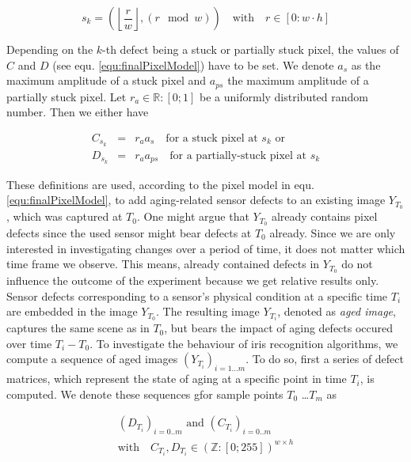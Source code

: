 \documentclass[10pt,twocolumn,letterpaper]{article}
\providecommand{\myfloor}[1]{\left \lfloor #1 \right \rfloor }
\begin{document}
\begin{equation}
 s_k = (\myfloor{\frac{r}{w}}, (r \mod{w})) \quad \text{with} \quad r \in [0:w \cdot h]
 \label{equ:defectLocation}
\end{equation}

Depending on the $k$-th defect being a stuck or partially stuck pixel, the values of $C$ and $D$ (see equ. \ref{equ:finalPixelModel}) have to be set. We denote $a_s$ as the maximum amplitude of a stuck pixel and $a_{ps}$ the maximum amplitude of a partially stuck pixel. Let $r_a \in \mathbb{R}:[0;1]$ be a uniformly distributed random number. Then we either have

\begin{eqnarray}
   C_{s_k}  & = & r_a  a_s \quad \text{for a stuck pixel at } s_k \text{ or} \label{equ:stucks} \\
   D_{s_k} & = &  r_a a_{ps} \quad \text{for a partially-stuck pixel at } s_k \label{equ:partiallyStuck}
\end{eqnarray}

These definitions are used, according to the pixel model in equ. \ref{equ:finalPixelModel}, to add aging-related sensor defects to an existing image $Y_{T_0}$, which was captured at ${T_0}$. One might argue that $Y_{T_0}$ already contains pixel defects since the used sensor might bear defects at $T_0$ already. Since we are only interested in investigating changes over a period of time, it does not matter which time frame we observe. This means, already contained defects in $Y_{T_0}$ do not influence the outcome of the experiment because we get relative results only. Sensor defects corresponding to a sensor's physical condition at a specific time $T_i$ are embedded in the image $Y_{T_0}$. The resulting image $Y_{T_i}$, denoted as \emph{aged image}, captures the same scene as in $T_0$, but bears the impact of aging defects occured over time ${T_i} - {T_0}$. To investigate the behaviour of iris recognition algorithms, we compute a sequence of aged images $(Y_{T_i})_{i=1 \dots m}$. To do so, first a series of defect matrices, which represent the state of aging at a specific point in time $T_i$, is computed. We denote these sequences gfor sample points $T_0$ \dots $T_m$ as

\begin{equation}
\begin{aligned}
(D_{T_i})_{i=0..m} \text{ and } (C_{T_i})_{i=0..m} \\ 
\text{with} \quad C_{T_i}, D_{T_i} \in {(\mathbb{Z}:[0;255])}^{w \times h}
\end{aligned}
\end{equation}
\end{document}
